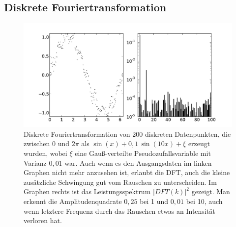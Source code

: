 \subsection{Diskrete Fouriertransformation}

\begin{figure}
  \centering
  \includegraphics[width=\textwidth]{plots/fftsin}
  \caption{Diskrete Fouriertransformation von 200 diskreten
    Datenpunkten, die zwischen 0 und $2\pi$ als $\sin(x) +
    0,1\,\sin(10 x) + \xi$ erzeugt wurden, wobei $\xi$ eine
    Gauß-verteilte Pseudozufallsvariable mit Varianz $0,01$ war.  Auch
    wenn es den Ausgangsdaten im linken Graphen nicht mehr anzusehen
    ist, erlaubt die DFT, auch die kleine zusätzliche Schwingung gut
    vom Rauschen zu unterscheiden. Im Graphen rechts ist das
    Leistungsspektrum $\lvert DFT(k)\rvert^2$ gezeigt.  Man erkennt
    die Amplitudenquadrate $0,25$ bei 1 und $0,01$ bei 10, auch wenn
    letztere Frequenz durch das Rauschen etwas an Intensität verloren
    hat.}
  \label{fig:fouriersin}
\end{figure}

